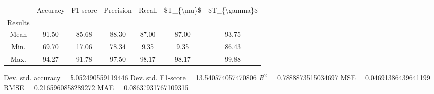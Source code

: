 \begin{tabular}{|c|c|c|c|c|c|c|}
\toprule
{} &  Accuracy &  F1 score &  Precision &  Recall &  \$T\_\{\textbackslash mu\}\$ &  \$T\_\{\textbackslash gamma\}\$ \\
Results &           &           &            &         &            &               \\
\hline
Mean    &     91.50 &     85.68 &      88.30 &   87.00 &      87.00 &         93.75 \\
Min.    &     69.70 &     17.06 &      78.34 &    9.35 &       9.35 &         86.43 \\
Max.    &     94.27 &     91.78 &      97.50 &   98.17 &      98.17 &         99.88 \\
\bottomrule
\end{tabular}

 Dev. std. accuracy = 5.052490559119446
 Dev. std. F1-score = 13.540574057470806
 $R^2$ = 0.7888873515034697
 MSE = 0.04691386439641199
 RMSE = 0.2165960858289272
 MAE = 0.08637931767109315